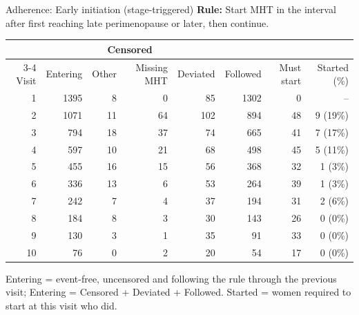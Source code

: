 \documentclass[aspectratio=169]{beamer}
\begin{document}
\begin{frame}{Adherence: Early initiation (stage-triggered)}
\centering
{\small \textbf{Rule:} Start MHT in the interval after first reaching late perimenopause or later, then continue.}\par\vspace{6pt}
{\scriptsize
\begin{tabular}{r r r r r r r r}
\toprule
 & & \multicolumn{2}{c}{Censored} & & & & \\
\cmidrule(lr){3-4}
Visit & Entering & Other & Missing MHT & Deviated & Followed & Must start & Started (\%) \\
\midrule
1 & 1395 & 8 & 0 & 85 & 1302 & 0 & -- \\
2 & 1071 & 11 & 64 & 102 & 894 & 48 & 9 (19\%) \\
3 & 794 & 18 & 37 & 74 & 665 & 41 & 7 (17\%) \\
4 & 597 & 10 & 21 & 68 & 498 & 45 & 5 (11\%) \\
5 & 455 & 16 & 15 & 56 & 368 & 32 & 1 (3\%) \\
6 & 336 & 13 & 6 & 53 & 264 & 39 & 1 (3\%) \\
7 & 242 & 7 & 4 & 37 & 194 & 31 & 2 (6\%) \\
8 & 184 & 8 & 3 & 30 & 143 & 26 & 0 (0\%) \\
9 & 130 & 3 & 1 & 35 & 91 & 33 & 0 (0\%) \\
10 & 76 & 0 & 2 & 20 & 54 & 17 & 0 (0\%) \\
\bottomrule
\end{tabular}}
\par\vspace{6pt}
{\tiny Entering = event-free, uncensored and following the rule through the previous visit; Entering = Censored + Deviated + Followed. Started = women required to start at this visit who did.}
\end{frame}
\end{document}
